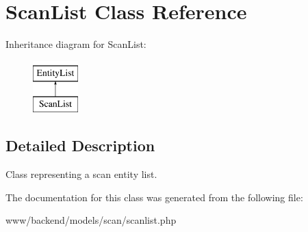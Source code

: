 \hypertarget{classScanList}{
\section{ScanList Class Reference}
\label{classScanList}
}
Inheritance diagram for ScanList:\begin{figure}[H]
\begin{center}
\leavevmode
\includegraphics[height=2.000000cm]{classScanList}
\end{center}
\end{figure}


\subsection{Detailed Description}
Class representing a scan entity list. 

The documentation for this class was generated from the following file:\begin{DoxyCompactItemize}
\item 
www/backend/models/scan/scanlist.php\end{DoxyCompactItemize}
